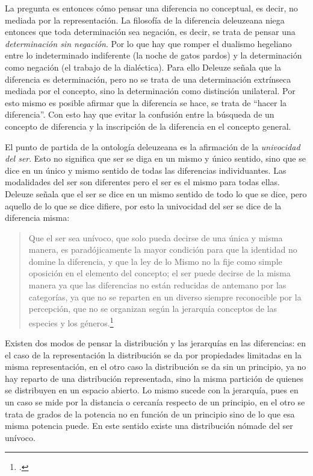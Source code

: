 \documentclass{book}
\begin{document}
La pregunta es entonces cómo pensar una diferencia no conceptual, es
decir, no mediada por la representación. La filosofía de la diferencia
deleuzeana niega entonces que toda determinación sea negación, es decir,
se trata de pensar una \emph{determinación sin negación}. Por lo que hay
que romper el dualismo hegeliano entre lo indeterminado indiferente (la
noche de gatos pardos) y la determinación como negación (el trabajo de
la dialéctica). Para ello Deleuze señala que la diferencia es
determinación, pero no se trata de una determinación extrínseca mediada
por el concepto, sino la determinación como distinción unilateral. Por
esto mismo es posible afirmar que la diferencia se hace, se trata de
\enquote{hacer la diferencia}. Con esto hay que evitar la confusión entre la
búsqueda de un concepto de diferencia y la inscripción de la diferencia
en el concepto general.

El punto de partida de la ontología deleuzeana es la afirmación de la
\emph{univocidad del ser}. Esto no significa que ser se diga en un mismo
y único sentido, sino que se dice en un único y mismo sentido de todas
las diferencias individuantes. Las modalidades del ser son diferentes
pero el ser es el mismo para todas ellas. Deleuze señala que el ser se
dice en un mismo sentido de todo lo que se dice, pero aquello de lo que
se dice difiere, por esto la univocidad del ser se dice de la diferencia
misma:

\begin{quote}
Que el ser sea unívoco, que solo pueda decirse de una única y misma
manera, es paradójicamente la mayor condición para que la identidad no
domine la diferencia, y que la ley de lo Mismo no la fije como simple
oposición en el elemento del concepto; el ser puede decirse de la misma
manera ya que las diferencias no están reducidas de antemano por las
categorías, ya que no se reparten en un diverso siempre reconocible por
la percepción, que no se organizan según la jerarquía conceptos de las
especies y los géneros.\footcite[42]{foucault1995}
\end{quote}

Existen dos modos de pensar la distribución y las jerarquías en las
diferencias: en el caso de la representación la distribución se da por
propiedades limitadas en la misma representación, en el otro caso la
distribución se da sin un principio, ya no hay reparto de una
distribución representada, sino la misma partición de quienes se
distribuyen en un espacio abierto. Lo mismo sucede con la jerarquía,
pues en un caso se mide por la distancia o cercanía respecto de un
principio, en el otro se trata de grados de la potencia no en función de
un principio sino de lo que esa misma potencia puede. En este sentido
existe una distribución nómade del ser unívoco.
\end{document}
